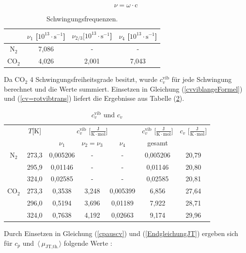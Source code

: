 \documentclass[a4paper,12pt,oneside,onecolum,final,openany]{report}
\begin{document}
\begin{equation}
\nu = \omega \cdot \mathrm{c} \label{KreisfrequenzUmrechnung}
\end{equation}


\begin{table}\caption{Schwingungsfrequenzen.} \label{TabelleSchwingungsfrequenzen}
\begin{tabular}{c|c|c|c} 
& $\nu_{1}$ [$ 10^{13} \cdot \text{s}^{-1}$]& $\nu_{2/3} [10^{13} \cdot \text{s}^{-1}$]& $\nu_{4}$ [$ 10^{13} \cdot \text{s}^{-1}$]\\
\hline
$\mathrm{N}_2$&7,086&-&-\\
$\mathrm{CO}_2$& 4,026&	2,001&7,043\\
\end{tabular}
\end{table}


Da $\mathrm{CO}_2$ 4 Schwingungsfreiheitsgrade besitzt, wurde $c_v^\mathrm{ vib}$ für jede Schwingung berechnet und die Werte summiert. Einsetzen in Gleichung (\ref{cvviblangeFormel}) und (\ref{cv=rotvibtrans}) liefert die Ergebnisse aus Tabelle (\ref{cvvibundcvTabelle}).\\

\begin{table}\caption{$c_v^\mathrm{vib}$ und $c_v$} \label{cvvibundcvTabelle}
\begin{tabular}{c|c|c|c|c|c|c}
&$T$[K]& \multicolumn{3}{|c|}{$c_v^\mathrm{vib}$ [$\frac{\mathrm{J}}{\mathrm{K}\cdot \mathrm{mol}}$] }&$c_v^\mathrm{vib}$ [$\frac{\mathrm{J}}{\mathrm{K}\cdot \mathrm{mol}}$] & $ c_v$ [$\frac{\mathrm{J}}{\mathrm{K}\cdot \mathrm{mol}}$] \\
&&$\nu_{1}$&$\nu_{2} = \nu_{3}$&$\nu_{4}$&gesamt&\\
\hline

	  $\text{N}_\mathrm{2}$ & 273,3&  0,005206&-& - &  0,005206 &20,79\\
	   & 295,9  &0,01146&-&-& 0,01146 &20,80\\
	  & 324,0 &0,02585 &-&-& 0,02585 & 20,81\\
\hline  
$\mathrm{CO}_2$&273,3&0,3538&	3,248&	0,005399&6,856&27,64\\
&296,0&0,5194&	3,696&	0,01189&7,922&28,71\\
&324,0& 0,7638&	4,192&	0,02663&9,174&29,96\\
\end{tabular}
\end{table}
\FloatBarrier

Durch Einsetzen in Gleichung (\ref{cpauscv}) und (\ref{EndgleichungJT}) ergeben sich für $c_p$ und~$\langle~\mu_{\text{JT,th.}}\rangle$ folgende Werte :\\
\end{document}
